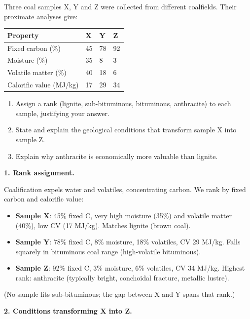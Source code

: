 \documentclass[11pt]{article}
\newcommand{\cle}[1]{{\popxbold\color{popdark}#1}}
\begin{document}
\begin{exoresolu}
Three coal samples X, Y and Z were collected from different coalfields. Their proximate analyses give:

\begin{center}
\begin{tabularx}{\linewidth}{|l|X|X|X|}
\hline
\rowcolor{popblueL} \textbf{Property} & \textbf{X} & \textbf{Y} & \textbf{Z} \\
\hline
Fixed carbon (\%) & 45 & 78 & 92 \\
\hline
Moisture (\%) & 35 & 8 & 3 \\
\hline
Volatile matter (\%) & 40 & 18 & 6 \\
\hline
Calorific value (MJ/kg) & 17 & 29 & 34 \\
\hline
\end{tabularx}
\end{center}

\begin{enumerate}
\item Assign a rank (lignite, sub-bituminous, bituminous, anthracite) to each sample, justifying your answer.
\item State and explain the geological conditions that transform sample X into sample Z.
\item Explain why anthracite is economically more valuable than lignite.
\end{enumerate}
\tcblower
\textbf{1. Rank assignment.}

Coalification expels water and volatiles, concentrating carbon. We rank by fixed carbon and calorific value:
\begin{itemize}
\item \textbf{Sample X}: 45\% fixed C, very high moisture (35\%) and volatile matter (40\%), low CV (17 MJ/kg). Matches \cle{lignite} (brown coal).
\item \textbf{Sample Y}: 78\% fixed C, 8\% moisture, 18\% volatiles, CV 29 MJ/kg. Falls squarely in \cle{bituminous coal} range (high-volatile bituminous).
\item \textbf{Sample Z}: 92\% fixed C, 3\% moisture, 6\% volatiles, CV 34 MJ/kg. Highest rank: \cle{anthracite} (typically bright, conchoidal fracture, metallic lustre).
\end{itemize}
(No sample fits sub-bituminous; the gap between X and Y spans that rank.)

\textbf{2. Conditions transforming X into Z.}


\end{exoresolu}
\end{document}
